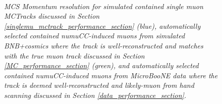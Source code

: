 
\begin{figure}
\centering
\mbox{
	\quad
	}
\caption{\textit{MCS Momentum resolution for simulated contained single muon {\sc MCTracks} discussed in Section \ref{singlemu_mctrack_performance_section} (blue), automatically selected contained numuCC-induced muons from simulated BNB+cosmics where the track is well-reconstructed and matches with the true muon track discussed in Section \ref{MC_performance_section} (green), and automatically selected contained numuCC-induced muons from MicroBooNE data where the track is deemed well-reconstructed and likely-muon from hand scanning discussed in Section \ref{data_performance_section}.}}\label{pub_plot_4}
\end{figure}

